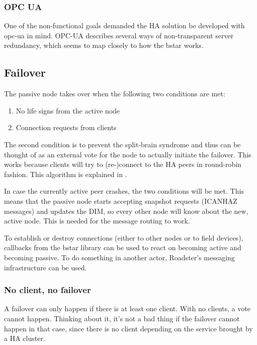 \subsubsection{OPC UA}
One of the non-functional goals demanded the HA solution be developed with
\gls{opc-ua} in mind. OPC-UA describes several ways of non-transparent server
redundancy, which seems to map closely to how the \gls{bstar} works.

\subsection{Failover}
The passive node takes over when the following two conditions are met:

\begin{enumerate}
\item No life signs from the active node
\item Connection requests from clients
\end{enumerate}

The second condition is to prevent the split-brain syndrome and thus can be
thought of as an external vote for the node to actually initiate the failover.
This works because clients will try to (re-)connect to the HA peers in
round-robin fashion.  This algorithm is explained in \cite[Chapter 4 - Reliable
Request-Reply Patterns, Client-Side Reliability (Lazy Pirate
Pattern)]{zmq:zguide}.

In case the currently active peer crashes, the two conditions will be met.
This means that the passive node starts accepting snapshot requests (ICANHAZ
messages) and updates the DIM, so every other node will know about the new,
active node. This is needed for the message routing to work.

To establish or destroy connections (either to other nodes or to field
devices), callbacks from the \gls{bstar} library can be used to react on
becoming active and becoming passive. To do something in another actor,
Roadster's messaging infrastructure can be used.

\subsubsection{No client, no failover}
A failover can only happen if there is at least one client. With no clients, a
vote cannot happen. Thinking about it, it's not a bad thing if the failover
cannot happen in that case, since there is no client depending on the service
brought by a HA cluster.

